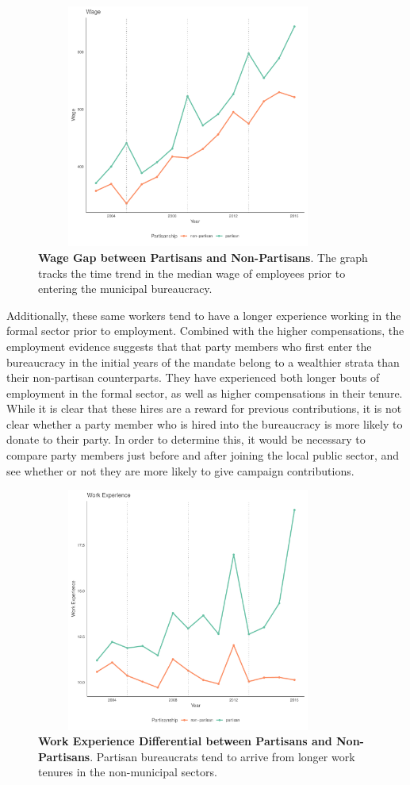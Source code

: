 \documentclass[12pt,a4paper]{article}
\begin{document}
\begin{figure}[H]
    \centering
    \includegraphics[width = 10cm, height = 8cm]{figures/partisanship/plot_median_wage.pdf}
    \caption{\textbf{Wage Gap between Partisans and Non-Partisans}. The graph tracks the time trend in the median wage of employees prior to entering the municipal bureaucracy.}
    \label{fig:wage_differential}
\end{figure}

Additionally, these same workers tend to have a longer experience working in the formal sector prior to employment. Combined with the higher compensations, the employment evidence suggests that that party members who first enter the bureaucracy in the initial years of the mandate belong to a wealthier strata than their non-partisan counterparts. They have experienced both longer bouts of employment in the formal sector, as well as higher compensations in their tenure. While it is clear that these hires are a reward for previous contributions, it is not clear whether a party member who is hired into the bureaucracy is more likely to donate to their party. In order to determine this, it would be necessary to compare party members just before and after joining the local public sector, and see whether or not they are more likely to give campaign contributions.

\begin{figure}[H]
    \centering
    \includegraphics[width = 10cm, height = 8cm]{figures/partisanship/plot_work_experience_mean.pdf}
    \caption{\textbf{Work Experience Differential between Partisans and Non-Partisans}. Partisan bureaucrats tend to arrive from longer work tenures in the non-municipal sectors.}
    \label{fig:work_experience}
\end{figure}
\end{document}
